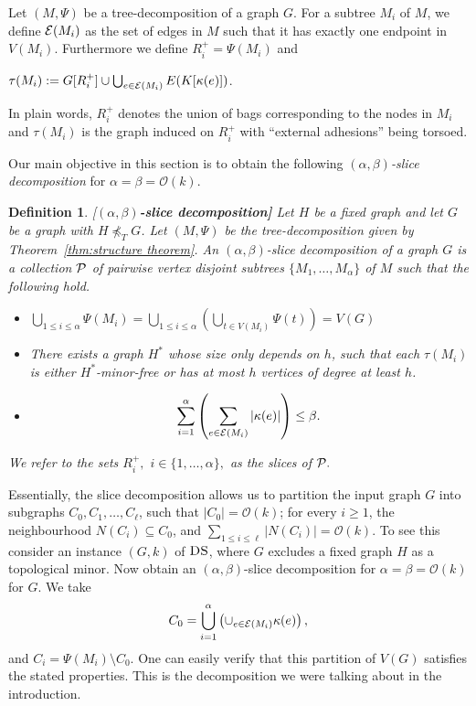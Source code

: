 \documentclass[11pt]{article}
\newtheorem{definition}{Definition}
\newcommand{\tDS}{{\texttt{\sc DS}}}
\newcommand{\cO}{\mathcal{O}}
\begin{document}
Let $(M,\Psi)$ be a tree-decomposition of a graph $G$. For a subtree $M_i$ of $M$, we define ${\cal E}(M_i)$ as the set of edges in $M$ such that it has exactly one endpoint in $V(M_i)$. Furthermore we define $R_i^+= \Psi(M_i)$ and 
\begin{center}
$\tau(M_i):=  G[R_i^+] \cup \bigcup_{e\in {\cal E}(M_i)} E(K[\kappa(e)])$.
\end{center}
In plain words, $R_i^+$ denotes the union of bags corresponding to the nodes in $M_i$ and $\tau(M_i)$ is the graph induced on  $R_i^+$ with ``external adhesions'' being torsoed. 

Our main objective in this section is to obtain the following $(\alpha,\beta)${\em-slice decomposition} for $\alpha=\beta=\cO(k)$. 

\begin{definition}{\rm [{\bf $(\alpha,\beta)$-slice decomposition]}}
Let $H$ be a fixed graph and let $G$ be a graph with $H\not\preceq_T G$.  Let  $(M,\Psi)$ be the 
tree-decomposition given by Theorem~\ref{thm:structure theorem}. An $(\alpha,\beta)${\em-slice decomposition} of a graph $G$
is a collection $\cal P$ of pairwise vertex disjoint  subtrees $\{M_1,\ldots,M_\alpha\}$  of $M$ such that the 
following hold. 

\begin{itemize}
\item $\bigcup_{1\leq i \leq \alpha}  \Psi(M_i) = \bigcup_{1\leq i \leq \alpha} \left(\bigcup_{t\in V(M_i)} \Psi(t) \right) =V(G)$
\item There exists a graph $H^*$ whose size only depends on $h$, such that each $\tau(M_i)$ is either $H^*$-minor-free
or  has at most $h$ vertices of degree at least $h$.

\item $$\sum_{i=1}^{\alpha} \left(\sum_{e\in {\cal E}(M_i)} |\kappa(e)|\right) \leq \beta.$$


\end{itemize}
We refer to the sets $R^{+}_{i},$ $i\in\{1,\ldots,\alpha \},$  as the {\em slices} of ${\cal P}.$
\end{definition}

Essentially, the slice decomposition allows us to  partition the input graph $G$ into subgraphs $C_0, C_1, \dots, C_\ell$, such that 
 $|C_0|=\cO(k)$; for every $i\geq 1$, the neighbourhood $N(C_i)\subseteq C_0$,  and $\sum_{1\leq i\leq \ell} |N(C_i)|=\cO(k)$. To see this consider an instance $(G,k)$ of $\tDS$, where $G$ excludes a fixed graph $H$ as a topological minor.  Now obtain an   $(\alpha,\beta)$-slice decomposition for $\alpha=\beta=\cO(k)$ for $G$. We take 
 $$C_0 = \bigcup_{i=1}^{\alpha} \left(\cup_{e\in {\cal E}(M_i)} \kappa(e)\right),$$
and $C_i= \Psi(M_i) \setminus C_0$. One can easily verify that this partition of $V(G)$ satisfies the stated properties.  
 This is the decomposition we were talking about in the introduction. 
 
\end{document}

